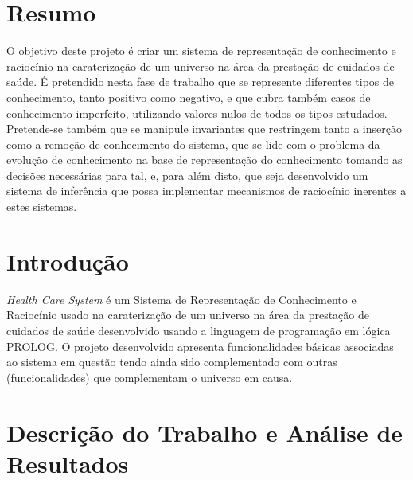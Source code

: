 \documentclass{article}
\begin{document}
\section{Resumo}
O objetivo deste projeto é criar um sistema de representação de conhecimento e raciocínio na caraterização de um universo na área da prestação de cuidados de saúde. É pretendido nesta fase de trabalho que se represente diferentes tipos de conhecimento, tanto positivo como negativo, e que cubra também casos de conhecimento imperfeito, utilizando valores nulos de todos os tipos estudados. Pretende-se também que se manipule invariantes que restringem tanto a inserção como a remoção de conhecimento do sistema, que se lide com o problema da evolução de conhecimento na base de representação do conhecimento tomando as decisões necessárias para tal, e, para além disto, que seja desenvolvido um sistema de inferência que  possa implementar mecanismos de raciocínio inerentes a estes sistemas.
\vspace*{\fill}

\newpage

\vspace*{\fill}
\tableofcontents
\vspace*{\fill}

\newpage

\vspace*{\fill}
\section{Introdução}
\textit{Health Care System} é um Sistema de Representação de Conhecimento e Raciocínio usado na caraterização de um universo na área da prestação de cuidados de saúde desenvolvido usando a linguagem de programação em lógica PROLOG. O projeto desenvolvido apresenta funcionalidades básicas associadas ao sistema em questão tendo ainda sido complementado com outras (funcionalidades) que complementam o universo em causa.
\vspace*{\fill}

\newpage

\section{Descrição do Trabalho e Análise de Resultados}
\end{document}
